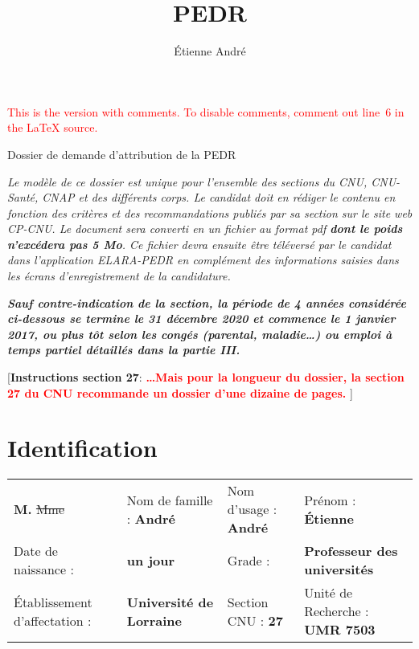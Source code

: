 \documentclass[a4paper,10pt]{article}
\title{PEDR}
\author{Étienne André}
\newcommand{\instructionsSection}[1]{{\color{blue}[\textbf{Instructions section 27}: #1]}}
\newcommand{\instructionsSection}[1]{}
\begin{document}
\ifdefined\VersionWithComments

	\textcolor{red}{This is the version with comments.
	To disable comments, comment out line~6 in the \LaTeX{} source.}
	
	\medskip
	
\fi

\begin{center}
	\Large
	Dossier de demande d'attribution de la PEDR
\end{center}

\noindent
\emph{Le modèle de ce dossier est unique pour l'ensemble des sections du CNU, CNU-Santé, CNAP et des différents corps. Le candidat doit en rédiger le contenu en fonction des critères et des recommandations publiés par sa section sur le site web CP-CNU.
Le document sera converti en un fichier au format pdf \textbf{dont le poids n'excédera pas 5 Mo}.
Ce fichier devra ensuite être téléversé par le candidat dans l'application ELARA-PEDR en complément des informations saisies dans les écrans d'enregistrement de la candidature. 
}

\smallskip

\noindent
\emph{\textbf{Sauf contre-indication de la section, la période de 4 années considérée ci-dessous se termine le 31 décembre 2020 et commence le 1\ier{} janvier 2017, ou plus tôt selon les congés (parental, maladie…) ou emploi à temps partiel détaillés dans la partie III.}}

\instructionsSection{\textcolor{red}{\textbf{ …Mais pour la longueur du dossier, la section 27 du CNU recommande un dossier d'une dizaine de pages. }}}

\smallskip


\tableofcontents{}


\section{Identification}

\begin{tabular}{l l l l}
	\textbf{M.}   \st{Mme} & Nom de famille : \textbf{André} & Nom d'usage : \textbf{André} & Prénom : \textbf{Étienne}\\
	Date de naissance : & \textbf{un jour} & Grade : & \textbf{Professeur des universités}\\
	Établissement d'affectation : & \textbf{Université de Lorraine} & Section CNU : \textbf{27} &  Unité de Recherche : \textbf{UMR 7503}

\end{tabular}
\end{document}
